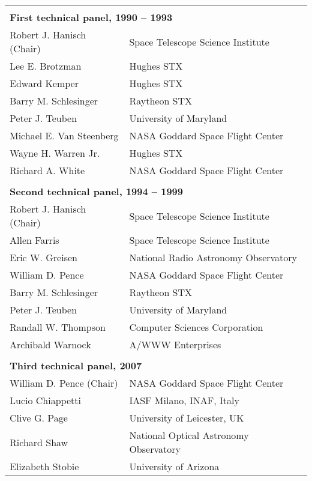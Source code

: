 \documentclass[11pt,makeidx]{book}     %
\begin{document}
\begin{table}[h]
\begin{center}
\begin{tabular}{ll} \\
\vspace{-5pt} \\
\multicolumn{2}{l}{\bf First technical panel, 1990 -- 1993} \\ 
  	 Robert J. Hanisch (Chair)  &  Space Telescope Science Institute \\
         Lee E. Brotzman  &  Hughes STX \\
         Edward Kemper  & Hughes STX \\
         Barry M. Schlesinger   & Raytheon STX \\
         Peter J. Teuben  & University of Maryland \\
         Michael E. Van Steenberg  & NASA Goddard Space Flight Center \\
         Wayne H. Warren Jr.  &  Hughes STX \\
         Richard A. White &  NASA Goddard Space Flight Center \\
       
\\
\multicolumn{2}{l}{\bf Second technical panel, 1994 -- 1999} \\ 

  	 Robert J. Hanisch (Chair)  &  Space Telescope Science Institute \\
         Allen Farris   & Space Telescope Science Institute \\
         Eric W. Greisen  & National Radio Astronomy Observatory \\
         William D. Pence   & NASA Goddard Space Flight Center \\
         Barry M. Schlesinger    & Raytheon STX \\
         Peter J. Teuben  & University of Maryland \\
         Randall W. Thompson  & Computer Sciences Corporation \\
         Archibald Warnock   & A/WWW Enterprises \\
\\	     
\multicolumn{2}{l}{\bf Third technical panel, 2007} \\ 

         William D. Pence (Chair)  & NASA Goddard Space Flight Center \\
         Lucio Chiappetti  & IASF Milano, INAF, Italy \\
         Clive G. Page  & University of Leicester, UK \\
         Richard Shaw  & National Optical Astronomy Observatory \\
         Elizabeth Stobie  & University of Arizona \\
	     
\end{tabular}
\end{center}
\end{table}   
\end{document}
